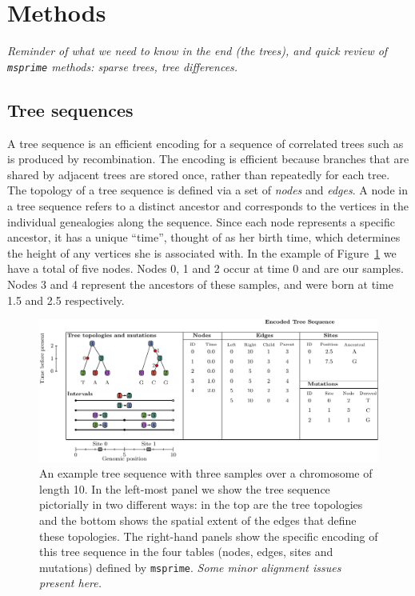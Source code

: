 \documentclass{article}
\newcommand{\msprime}{\texttt{msprime}}
\newcommand{\plr}[1]{{\em \color{blue} #1}}
\newcommand{\jk}[1]{{\em \color{red} #1}}
\begin{document}
\section*{Methods}

\plr{Reminder of what we need to know in the end (the trees), and
    quick review of \msprime{} methods: sparse trees, tree differences.}

\subsection*{Tree sequences}
A tree sequence is an efficient encoding for a sequence of correlated trees such as
is produced by recombination. The encoding is efficient because branches that are
shared by adjacent trees are stored once, rather than repeatedly for each tree.
The topology of a tree sequence is defined via a set of \emph{nodes} and
\emph{edges}. A node in a tree sequence refers to a distinct ancestor and
corresponds to the vertices in the individual genealogies along the sequence.
Since each node represents a specific ancestor, it has a unique ``time'',
thought of as her birth time, which determines the height of any vertices
she is associated with. In the example of Figure~\ref{fig:example_tree_sequence}
we have a total of five nodes. Nodes 0, 1 and 2 occur at time 0 and are our
samples. Nodes 3 and 4 represent the ancestors of these samples, and were born at
time 1.5 and 2.5 respectively.

\begin{figure}
    \begin{center}
        \includegraphics[width=\textwidth]{example_tree_sequence}
    \end{center}
    \caption{
        An example tree sequence with three samples over a chromosome of length 10. In the
        left-most panel we show the tree sequence pictorially in two different ways:
        in the top are the tree topologies and the bottom shows the spatial extent of the
        edges that define these topologies. The right-hand panels show the specific encoding
        of this tree sequence in the four tables (nodes, edges, sites and mutations) defined
        by \msprime.
        \jk{Some minor alignment issues present here.}
        \label{fig:example_tree_sequence}
    }
\end{figure}
\end{document}
